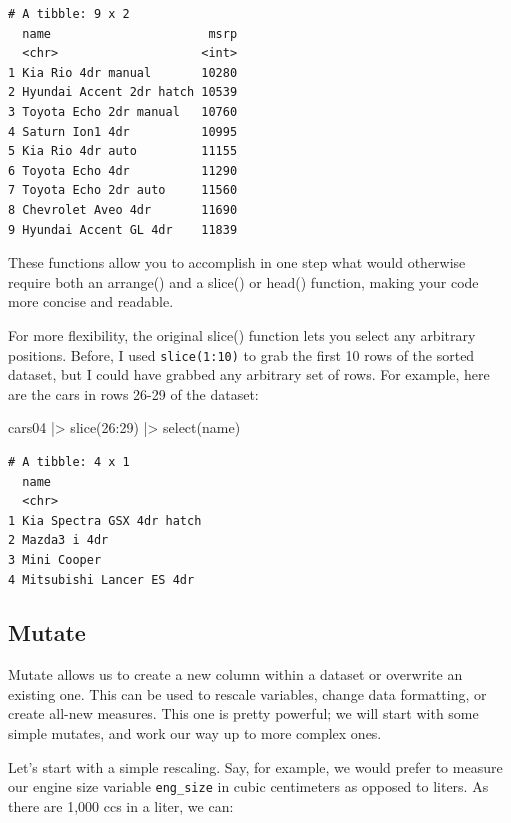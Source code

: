 \documentclass[
  letterpaper,
]{book}
\newenvironment{Shaded}{\begin{snugshade}}{\end{snugshade}}
\newcommand{\DecValTok}[1]{\textcolor[rgb]{0.68,0.00,0.00}{#1}}
\newcommand{\FunctionTok}[1]{\textcolor[rgb]{0.28,0.35,0.67}{#1}}
\newcommand{\NormalTok}[1]{\textcolor[rgb]{0.00,0.23,0.31}{#1}}
\newcommand{\SpecialCharTok}[1]{\textcolor[rgb]{0.37,0.37,0.37}{#1}}
\begin{document}
\begin{verbatim}
# A tibble: 9 x 2
  name                      msrp
  <chr>                    <int>
1 Kia Rio 4dr manual       10280
2 Hyundai Accent 2dr hatch 10539
3 Toyota Echo 2dr manual   10760
4 Saturn Ion1 4dr          10995
5 Kia Rio 4dr auto         11155
6 Toyota Echo 4dr          11290
7 Toyota Echo 2dr auto     11560
8 Chevrolet Aveo 4dr       11690
9 Hyundai Accent GL 4dr    11839
\end{verbatim}

These functions allow you to accomplish in one step what would otherwise
require both an arrange() and a slice() or head() function, making your
code more concise and readable.

For more flexibility, the original slice() function lets you select any
arbitrary positions. Before, I used \texttt{slice(1:10)} to grab the
first 10 rows of the sorted dataset, but I could have grabbed any
arbitrary set of rows. For example, here are the cars in rows 26-29 of
the dataset:

\begin{Shaded}
\begin{Highlighting}[]
\NormalTok{cars04 }\SpecialCharTok{|\textgreater{}} 
  \FunctionTok{slice}\NormalTok{(}\DecValTok{26}\SpecialCharTok{:}\DecValTok{29}\NormalTok{) }\SpecialCharTok{|\textgreater{}} 
  \FunctionTok{select}\NormalTok{(name)}
\end{Highlighting}
\end{Shaded}

\begin{verbatim}
# A tibble: 4 x 1
  name                     
  <chr>                    
1 Kia Spectra GSX 4dr hatch
2 Mazda3 i 4dr             
3 Mini Cooper              
4 Mitsubishi Lancer ES 4dr 
\end{verbatim}

\subsection{Mutate}\label{mutate}

Mutate allows us to create a new column within a dataset or overwrite an
existing one. This can be used to rescale variables, change data
formatting, or create all-new measures. This one is pretty powerful; we
will start with some simple mutates, and work our way up to more complex
ones.

Let's start with a simple rescaling. Say, for example, we would prefer
to measure our engine size variable \texttt{eng\_size} in cubic
centimeters as opposed to liters. As there are 1,000 ccs in a liter, we
can:
\end{document}
